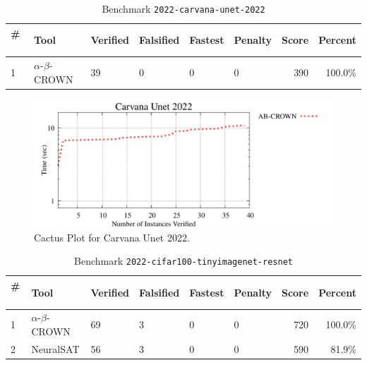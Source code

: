 

\begin{table}[h]
\begin{center}
\caption{Benchmark \texttt{2022-carvana-unet-2022}} \label{tab:cat_{cat}}
{\setlength{\tabcolsep}{2pt}
\begin{tabular}[h]{@{}llllllrr@{}}
\toprule
\textbf{\# ~} & \textbf{Tool} & \textbf{Verified} & \textbf{Falsified} & \textbf{Fastest} & \textbf{Penalty} & \textbf{Score} & \textbf{Percent}\\
\midrule
1 & $\alpha$-$\beta$-CROWN & 39 & 0 & 0 & 0 & 390 & 100.0\% \\
\bottomrule
\end{tabular}
}
\end{center}
\end{table}



\begin{figure}[h]
\centerline{\includegraphics[width=\textwidth]{cactus/2022_carvana_unet_2022.pdf}}
\caption{Cactus Plot for Carvana Unet 2022.}
\label{fig:quantPic}
\end{figure}



\begin{table}[h]
\begin{center}
\caption{Benchmark \texttt{2022-cifar100-tinyimagenet-resnet}} \label{tab:cat_{cat}}
{\setlength{\tabcolsep}{2pt}
\begin{tabular}[h]{@{}llllllrr@{}}
\toprule
\textbf{\# ~} & \textbf{Tool} & \textbf{Verified} & \textbf{Falsified} & \textbf{Fastest} & \textbf{Penalty} & \textbf{Score} & \textbf{Percent}\\
\midrule
1 & $\alpha$-$\beta$-CROWN & 69 & 3 & 0 & 0 & 720 & 100.0\% \\
2 & NeuralSAT & 56 & 3 & 0 & 0 & 590 & 81.9\% \\
\bottomrule
\end{tabular}
}
\end{center}
\end{table}



